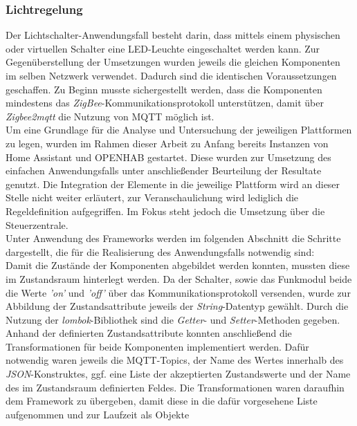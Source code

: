     \subsubsection*{Lichtregelung}
    Der Lichtschalter-Anwendungsfall besteht darin, dass mittels einem physischen oder virtuellen Schalter eine LED-Leuchte eingeschaltet werden kann. Zur 
    Gegenüberstellung der Umsetzungen wurden jeweils die gleichen Komponenten im selben Netzwerk verwendet. Dadurch sind die identischen Voraussetzungen geschaffen. 
    Zu Beginn musste sichergestellt werden, dass die Komponenten mindestens das \textit{ZigBee}-Kommunikationsprotokoll unterstützen, damit über \textit{Zigbee2mqtt} 
    die Nutzung von \acs{MQTT} möglich ist. 
    \\
    Um eine Grundlage für die Analyse und Untersuchung der jeweiligen Plattformen zu legen, wurden im Rahmen dieser Arbeit zu Anfang bereits Instanzen von Home Assistant und 
    \acs{OPENHAB} gestartet. Diese wurden zur Umsetzung des einfachen Anwendungsfalls unter anschließender Beurteilung der Resultate genutzt. 
    Die Integration der Elemente in die jeweilige Plattform wird an dieser Stelle nicht weiter erläutert, zur Veranschaulichung wird 
    lediglich die Regeldefinition aufgegriffen. Im Fokus steht jedoch die Umsetzung über die Steuerzentrale.
    \\
    \linebreak
    Unter Anwendung des Frameworks werden im folgenden Abschnitt die Schritte dargestellt, die für die Realisierung des Anwendungsfalls notwendig sind: 
    \\
    Damit die Zustände der Komponenten abgebildet werden konnten, mussten diese im Zustandsraum hinterlegt werden. Da der Schalter, sowie das Funkmodul 
    beide die Werte \textit{'on'} und \textit{'off'} über das Kommunikationsprotokoll versenden, wurde zur Abbildung der Zustandsattribute jeweils der \textit{String}-Datentyp gewählt. 
    Durch die Nutzung der \textit{lombok}-Bibliothek sind die \textit{Getter}- und \textit{Setter}-Methoden gegeben. 
    \\
    Anhand der definierten Zustandsattribute konnten anschließend die Transformationen für beide Komponenten implementiert werden. Dafür notwendig waren jeweils 
    die \acs{MQTT}-Topics, der Name des Wertes innerhalb des \textit{JSON}-Konstruktes, ggf. eine Liste der akzeptierten Zustandswerte und der Name des im Zustandsraum 
    definierten Feldes. Die Transformationen waren daraufhin dem Framework zu übergeben, damit diese in die dafür vorgesehene Liste aufgenommen und zur Laufzeit als Objekte 
